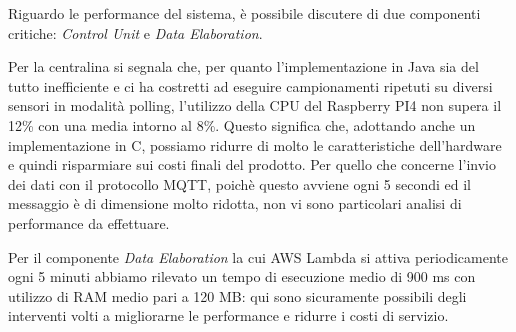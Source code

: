 Riguardo le performance del sistema, è possibile discutere di due componenti critiche: \textit{Control Unit} e \textit{Data Elaboration}.

Per la centralina si segnala che, per quanto l'implementazione in Java sia del tutto inefficiente e ci ha costretti ad eseguire campionamenti ripetuti su diversi sensori in modalità polling, 
l'utilizzo della CPU del Raspberry PI4 non supera il 12\% con una media intorno al 8\%.
Questo significa che, adottando anche un implementazione in C, possiamo ridurre di molto le caratteristiche dell'hardware e quindi risparmiare sui costi finali del prodotto.
Per quello che concerne l'invio dei dati con il protocollo MQTT, poichè questo avviene ogni 5 secondi ed il messaggio è di dimensione molto ridotta, non vi sono particolari analisi di performance da effettuare.

Per il componente \textit{Data Elaboration} la cui AWS Lambda si attiva periodicamente ogni 5 minuti abbiamo rilevato un tempo di esecuzione medio di 900 ms con utilizzo di RAM medio pari a 120 MB:
qui sono sicuramente possibili degli interventi volti a migliorarne le performance e ridurre i costi di servizio.

\newpage